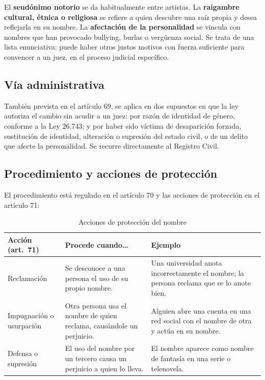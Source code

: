 \documentclass[12pt,oneside]{book}
\begin{document}
El \textbf{seudónimo notorio} se da habitualmente entre artistas. La \textbf{raigambre cultural, étnica o religiosa} se refiere a quien descubre una raíz propia y desea reflejarla en su nombre. La \textbf{afectación de la personalidad} se vincula con nombres que han provocado bullying, burlas o vergüenza social. Se trata de una lista enunciativa: puede haber otros justos motivos con fuerza suficiente para convencer a un juez, en el proceso judicial específico.

\subsection{Vía administrativa}

También prevista en el artículo 69, se aplica en dos supuestos en que la ley autoriza el cambio sin acudir a un juez: por razón de identidad de género, conforme a la Ley 26.743; y por haber sido víctima de desaparición forzada, sustitución de identidad, alteración o supresión del estado civil, o de un delito que afecte la personalidad. Se recurre directamente al Registro Civil.

\subsection{Procedimiento y acciones de protección}

El procedimiento está regulado en el artículo 70 y las acciones de protección en el artículo 71:

\begin{table}[H]
\centering
\begin{tabularx}{\textwidth}{B{0.26\textwidth} Y Y}
\toprule
\textbf{Acción (art.~71)} & \textbf{Procede cuando\ldots} & \textbf{Ejemplo} \\
\midrule
Reclamación & Se desconoce a una persona el uso de su propio nombre. & Una universidad anota incorrectamente el nombre; la persona reclama que se lo anote bien. \\
Impugnación o usurpación & Otra persona usa el nombre de quien reclama, causándole un perjuicio. & Alguien abre una cuenta en una red social con el nombre de otra y actúa en su nombre. \\
Defensa o supresión & El uso del nombre por un tercero causa un perjuicio a quien lo lleva. & El nombre aparece como nombre de fantasía en una serie o telenovela. \\
\bottomrule
\end{tabularx}
\caption{Acciones de protección del nombre}
\end{table}
\end{document}
